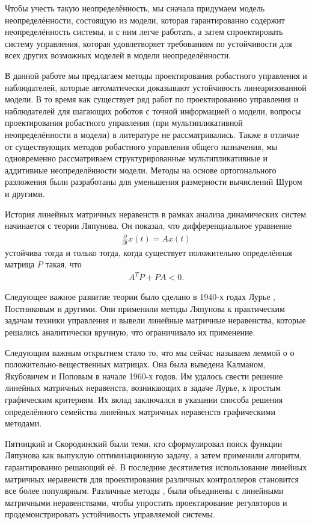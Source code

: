 Чтобы учесть такую неопределённость, мы сначала придумаем модель неопределённости, состоящую из модели, которая гарантированно содержит неопределённость системы, и с ним легче работать, а затем спроектировать систему управления, которая удовлетворяет требованиям по устойчивости для всех других возможных моделей в модели неопределённости.

В данной работе мы предлагаем методы проектирования робастного управления и наблюдателей, которые автоматически доказывают устойчивость линеаризованной модели. В то время как существует ряд работ по проектированию управления и наблюдателей для шагающих роботов с точной информацией о модели, вопросы проектирования робастного управления (при мультипликативной неопределённости в модели) в литературе не рассматривались. Также в отличие от существующих методов робастного управления общего назначения, мы одновременно рассматриваем структурированные мультипликативные и аддитивные неопределённости модели.
Методы на основе ортогонального разложения были разработаны для уменьшения размерности вычислений Шуром и другими.

{\progress}

История линейных матричных неравенств в рамках анализа динамических систем начинается с теории Ляпунова. Он показал, что дифференциальное уравнение
\begin{align*}
	\frac{\partial}{\partial t}x(t)=Ax(t)
\end{align*}
устойчива тогда и только тогда, когда существует положительно определённая матрица $P$ такая, что
\begin{align*}
	A^T P + P A <0.
\end{align*}

Следующее важное развитие теории было сделано в 1940-х годах Лурье \cite{LMI1}, Постниковым и другими. 
Они применили методы Ляпунова к практическим задачам техники управления и вывели линейные матричные неравенства, которые решались аналитически вручную, что ограничивало их применение. 

Следующим важным открытием стало то, что мы сейчас называем леммой о о положительно-вещественных матрицах. Она была выведена Калманом, Якубовичем и Поповым в начале 1960-х годов. Им удалось свести решение линейных матричных неравенств, возникающих в задаче Лурье, к простым графическим критериям. Их вклад \cite{LMI2} заключался в указании способа решения определённого семейства линейных матричных неравенств графическими методами.

Пятницкий и Скородинский \cite{LMI3} были теми, кто сформулировал поиск функции Ляпунова как выпуклую оптимизационную задачу, а затем применили алгоритм, гарантированно решающий её.
В последние десятилетия использование линейных матричных неравенств для проектирования различных контроллеров становится все более популярным. Различные методы \cite{LMI4}, \cite{LMI5} были объединены с линейными матричными неравенствами, чтобы упростить проектирование регуляторов и продемонстрировать устойчивость управляемой системы.

